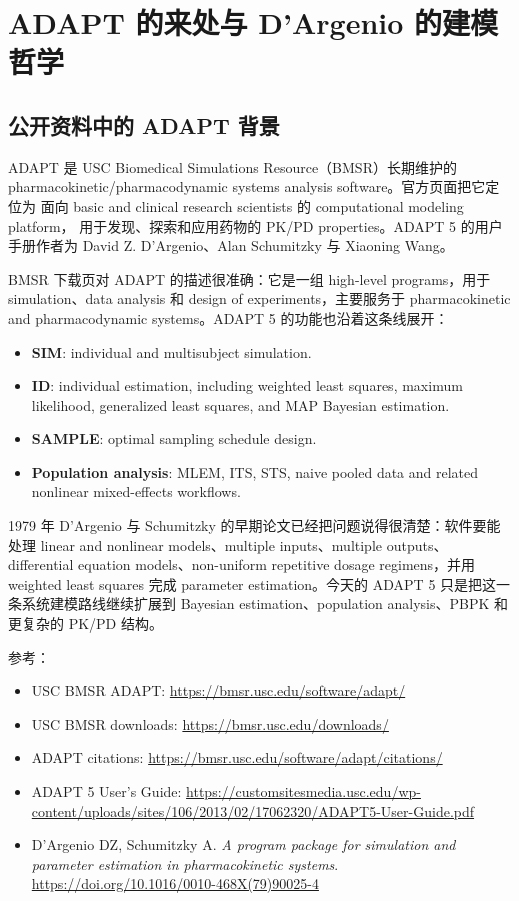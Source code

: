 \documentclass[a4paper]{article}
\newcommand{\concept}[1]{\textbf{#1}}
\begin{document}
\maketitle
\tableofcontents

\section{ADAPT 的来处与 D'Argenio 的建模哲学}

\subsection{公开资料中的 ADAPT 背景}

ADAPT 是 USC Biomedical Simulations Resource（BMSR）长期维护的
pharmacokinetic/pharmacodynamic systems analysis software。官方页面把它定位为
面向 basic and clinical research scientists 的 computational modeling platform，
用于发现、探索和应用药物的 PK/PD properties。ADAPT 5 的用户手册作者为
David Z. D'Argenio、Alan Schumitzky 与 Xiaoning Wang。

BMSR 下载页对 ADAPT 的描述很准确：它是一组 high-level programs，用于
simulation、data analysis 和 design of experiments，主要服务于
pharmacokinetic and pharmacodynamic systems。ADAPT 5 的功能也沿着这条线展开：

\begin{itemize}
  \item \concept{SIM}: individual and multisubject simulation.
  \item \concept{ID}: individual estimation, including weighted least squares,
  maximum likelihood, generalized least squares, and MAP Bayesian estimation.
  \item \concept{SAMPLE}: optimal sampling schedule design.
  \item \concept{Population analysis}: MLEM, ITS, STS, naive pooled data and related
  nonlinear mixed-effects workflows.
\end{itemize}

1979 年 D'Argenio 与 Schumitzky 的早期论文已经把问题说得很清楚：软件要能处理
linear and nonlinear models、multiple inputs、multiple outputs、differential
equation models、non-uniform repetitive dosage regimens，并用 weighted least squares
完成 parameter estimation。今天的 ADAPT 5 只是把这一条系统建模路线继续扩展到
Bayesian estimation、population analysis、PBPK 和更复杂的 PK/PD 结构。

参考：
\begin{itemize}
  \item USC BMSR ADAPT: \url{https://bmsr.usc.edu/software/adapt/}
  \item USC BMSR downloads: \url{https://bmsr.usc.edu/downloads/}
  \item ADAPT citations: \url{https://bmsr.usc.edu/software/adapt/citations/}
  \item ADAPT 5 User's Guide: \url{https://customsitesmedia.usc.edu/wp-content/uploads/sites/106/2013/02/17062320/ADAPT5-User-Guide.pdf}
  \item D'Argenio DZ, Schumitzky A. \emph{A program package for simulation and parameter estimation in pharmacokinetic systems}. \url{https://doi.org/10.1016/0010-468X(79)90025-4}
\end{itemize}
\end{document}
